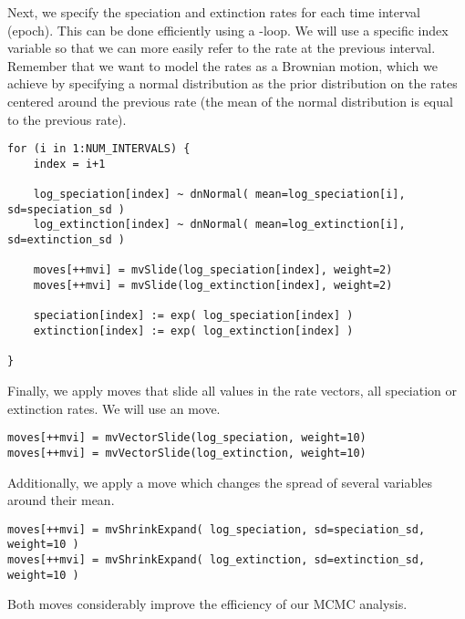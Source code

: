 Next, we specify the speciation and extinction rates for each time interval (\IE epoch).
This can be done efficiently using a -loop.
We will use a specific index variable so that we can more easily refer to the rate at the previous interval.
Remember that we want to model the rates as a Brownian motion, which we achieve by specifying a normal distribution as the prior distribution on the rates centered around the previous rate (\IE the mean of the normal distribution is equal to the previous rate).
{\tt \begin{snugshade*}
\begin{lstlisting}
for (i in 1:NUM_INTERVALS) {
    index = i+1

    log_speciation[index] ~ dnNormal( mean=log_speciation[i], sd=speciation_sd )
    log_extinction[index] ~ dnNormal( mean=log_extinction[i], sd=extinction_sd )

    moves[++mvi] = mvSlide(log_speciation[index], weight=2)
    moves[++mvi] = mvSlide(log_extinction[index], weight=2)

    speciation[index] := exp( log_speciation[index] )
    extinction[index] := exp( log_extinction[index] )

}
\end{lstlisting}
\end{snugshade*}}
Finally, we apply moves that slide all values in the rate vectors, \IE all speciation or extinction rates.
We will use an  move.
{\tt \begin{snugshade*}
\begin{lstlisting}
moves[++mvi] = mvVectorSlide(log_speciation, weight=10)
moves[++mvi] = mvVectorSlide(log_extinction, weight=10)
\end{lstlisting}
\end{snugshade*}}

Additionally, we apply a  move which changes the spread of several variables around their mean.
{\tt \begin{snugshade*}
\begin{lstlisting}
moves[++mvi] = mvShrinkExpand( log_speciation, sd=speciation_sd, weight=10 )
moves[++mvi] = mvShrinkExpand( log_extinction, sd=extinction_sd, weight=10 )
\end{lstlisting}
\end{snugshade*}}
Both moves considerably improve the efficiency of our MCMC analysis.


